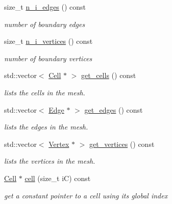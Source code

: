 \begin{DoxyCompactItemize}
\mbox{\label{classHArDCore2D_1_1Mesh_a7650c95dec763d4aa3fcb44644229f0e}} 
size\+\_\+t \hyperlink{classHArDCore2D_1_1Mesh_a7650c95dec763d4aa3fcb44644229f0e}{n\+\_\+i\+\_\+edges} () const
\begin{DoxyCompactList}\small\item\em number of boundary edges \end{DoxyCompactList}\item 
\mbox{\label{classHArDCore2D_1_1Mesh_a209126a0e22bea2f597dbc844110123c}} 
size\+\_\+t \hyperlink{classHArDCore2D_1_1Mesh_a209126a0e22bea2f597dbc844110123c}{n\+\_\+i\+\_\+vertices} () const
\begin{DoxyCompactList}\small\item\em number of boundary vertices \end{DoxyCompactList}\item 
std\+::vector$<$ \hyperlink{classHArDCore2D_1_1Cell}{Cell} $\ast$ $>$ \hyperlink{group__Mesh_gabae9df200fe23a302b3d01e4ff13f921}{get\+\_\+cells} () const
\begin{DoxyCompactList}\small\item\em lists the cells in the mesh. \end{DoxyCompactList}\item 
std\+::vector$<$ \hyperlink{classHArDCore2D_1_1Edge}{Edge} $\ast$ $>$ \hyperlink{group__Mesh_ga9a2d7a3f9f870455465e1a9204ee3d53}{get\+\_\+edges} () const
\begin{DoxyCompactList}\small\item\em lists the edges in the mesh. \end{DoxyCompactList}\item 
std\+::vector$<$ \hyperlink{classHArDCore2D_1_1Vertex}{Vertex} $\ast$ $>$ \hyperlink{group__Mesh_ga3ef9f9e205077bdb5c1057602bde5d70}{get\+\_\+vertices} () const
\begin{DoxyCompactList}\small\item\em lists the vertices in the mesh. \end{DoxyCompactList}\item 
\mbox{\label{classHArDCore2D_1_1Mesh_ae07b938c57cf57e3bb9c76d3df1eb549}} 
\hyperlink{classHArDCore2D_1_1Cell}{Cell} $\ast$ \hyperlink{classHArDCore2D_1_1Mesh_ae07b938c57cf57e3bb9c76d3df1eb549}{cell} (size\+\_\+t iC) const
\begin{DoxyCompactList}\small\item\em get a constant pointer to a cell using its global index \end{DoxyCompactList}\item 

\end{DoxyCompactItemize}

